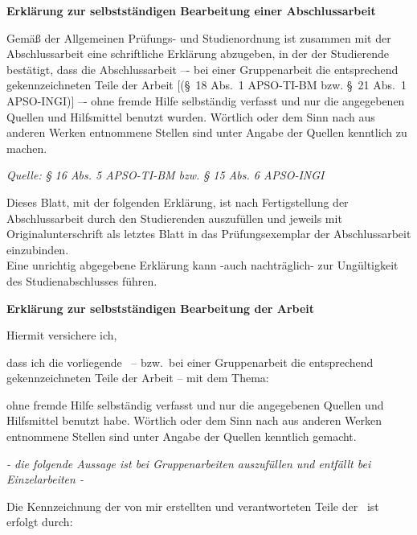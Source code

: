 \clearpage
\thispagestyle{plain}
\ITocEntryStatement
\textbf{\sffamily\large Erklärung zur selbstständigen Bearbeitung einer Abschlussarbeit}

{\footnotesize
Gemäß der Allgemeinen Prüfungs- und Studienordnung ist zusammen mit der Abschlussarbeit eine schriftliche Erklärung abzugeben, in der der Studierende bestätigt, dass die Abschlussarbeit \glqq–- bei einer Gruppenarbeit die entsprechend gekennzeichneten Teile der Arbeit [(§~18 Abs.~1 APSO-TI-BM bzw. §~21 Abs.~1 APSO-INGI)] –- ohne fremde Hilfe selbständig verfasst und nur die angegebenen Quellen und Hilfsmittel benutzt wurden. Wörtlich oder dem Sinn nach aus anderen Werken entnommene Stellen sind unter Angabe der Quellen kenntlich zu machen.\grqq
}

\hfill {\em\footnotesize Quelle: § 16 Abs. 5 APSO-TI-BM bzw. § 15 Abs. 6 APSO-INGI}

{\footnotesize
Dieses Blatt, mit der folgenden Erklärung, ist nach Fertigstellung der Abschlussarbeit durch den Studierenden auszufüllen und jeweils mit Originalunterschrift als letztes Blatt in das Prüfungsexemplar der Abschlussarbeit einzubinden.\\
Eine unrichtig abgegebene Erklärung kann -auch nachträglich- zur Ungültigkeit des Studienabschlusses führen.
}


\vspace{1cm}
\textbf{\sffamily Erklärung zur selbstständigen Bearbeitung der Arbeit}

Hiermit versichere ich,
\par\noindent{}    \makebox[8cm]{\hrulefill}
\par\noindent{} \makebox[8cm]{\hrulefill}

dass ich die vorliegende \IthesisKindDE\ -- bzw.\ bei einer Gruppenarbeit die entsprechend gekennzeichneten Teile der Arbeit -- mit dem Thema:

\textbf{\IthesisTitleEN}

ohne fremde Hilfe selbständig verfasst und nur die angegebenen Quellen und Hilfsmittel benutzt habe.
Wörtlich oder dem Sinn nach aus anderen Werken entnommene Stellen sind unter Angabe der Quellen kenntlich gemacht.

\begin{center}
  \emph{\footnotesize- die folgende Aussage ist bei Gruppenarbeiten auszufüllen und entfällt bei Einzelarbeiten -}
\end{center}

Die Kennzeichnung der von mir erstellten und verantworteten Teile der \IthesisKindDE\ ist erfolgt durch:

